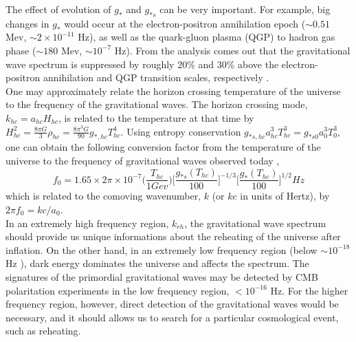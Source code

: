 \documentclass[11pt,a4paper,twoside]{book}
\begin{document}
The effect of evolution of $ g_{*} $ and $ g_{*s} $ can be very important. For example, big changes in  $ g_{*} $ would occur at the electron-positron annihilation epoch ($\sim 0.51$ Mev, $\sim 2 \times 10^{-11}$ Hz), as well as the quark-gluon plasma (QGP) to hadron gas phase  ($\sim 180$ Mev, $\sim 10^{-7}$ Hz). From the analysis comes out that the gravitational wave spectrum is suppressed by roughly $ 20\% $ and $ 30\% $ above the electron-positron annihilation and QGP transition scales, respectively \cite{Chap3:GW_Watanabe_Komatsu}.\\
One may approximately relate the horizon crossing temperature of the universe to the frequency of the gravitational waves.  The horizon crossing mode, $ k_{hc} = a_{hc}H_{hc} $, is related to the temperature at that time by $ H^{2}_{hc}=\frac{8\pi G}{3}\rho_{hc}=\frac{8\pi^{3}G}{90}g_{*,hc}T^{4}_{hc} $. Using entropy conservation $ g_{*s,hc}a^{3}_{hc}T^{3}_{hc} = g_{*s0}a_{0}^{3}T_{0}^{3} $, one can obtain the following conversion factor  from the temperature of the universe to the frequency of gravitational waves observed today \cite{Chap3:Kamionkowsy_Turner},
\begin{equation}
		\label{Chap3:frequencyTodayGW}
		f_{0} = 1.65 \times 2\pi \times 10^{-7} \Big(\frac{T_{hc}}{1 Gev}\Big) \Big [\frac{g_{*s}(T_{hc})}{100}\Big]^{-1/3}  \Big [\frac{g_{*}(T_{hc})}{100}\Big]^{1/2} Hz 
\end{equation}
 which is related to the comoving wavenumber, $ k $ (or $ kc $ in units of Hertz),  by $ 2\pi f_{0} = kc/a_{0} $.\\
 In an extremely high frequency region, $ k_{rh} $, the gravitational wave spectrum should provide us unique informations about the reheating of the universe after inflation. On the other hand, in an extremely low frequency region (below $ \sim 10^{-18}$ Hz ), dark energy dominates the universe and affects the spectrum. The signatures of the primordial gravitational waves may be detected  by CMB polaritation experiments in the low frequency region, $ < 10^{-16} $ Hz. For the higher frequency region, however, direct detection of the gravitational waves would be necessary, and it should allows us to search for a particular cosmological event, such as reheating.
\end{document}
